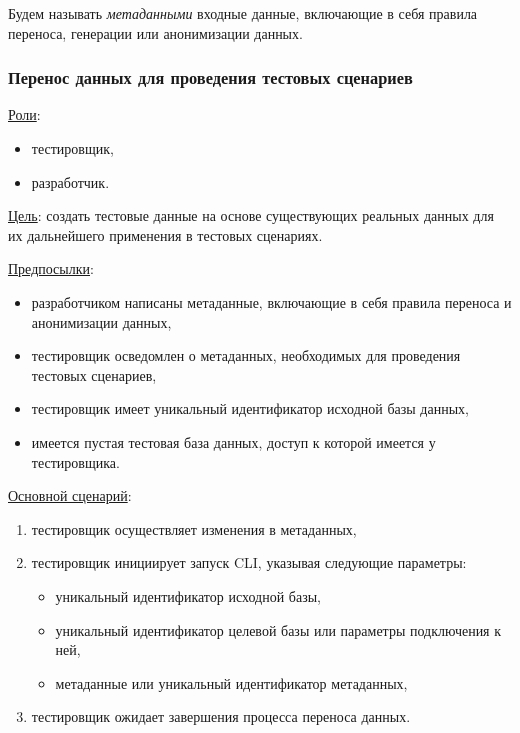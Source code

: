 Будем называть \textit{метаданными} входные данные, включающие в себя правила переноса, генерации или анонимизации данных.

\subsubsection{Перенос данных для проведения тестовых сценариев}

\underline{Роли}:

\begin{itemize}
    \item тестировщик,
    \item разработчик.
\end{itemize}

\underline{Цель}: создать тестовые данные на основе существующих реальных данных для их дальнейшего применения в тестовых сценариях.

\underline{Предпосылки}:

\begin{itemize}
    \item разработчиком написаны метаданные, включающие в себя правила переноса и анонимизации данных,
    \item тестировщик осведомлен о метаданных, необходимых для проведения тестовых сценариев,
    \item тестировщик имеет уникальный идентификатор исходной базы данных,
    \item имеется пустая тестовая база данных, доступ к которой имеется у тестировщика.
\end{itemize}

\underline{Основной сценарий}:

\begin{enumerate}
    \item тестировщик осуществляет изменения в метаданных,
    \item тестировщик инициирует запуск CLI, указывая следующие параметры:
    \begin{itemize}
        \item уникальный идентификатор исходной базы,
        \item уникальный идентификатор целевой базы или параметры подключения к ней,
        \item метаданные или уникальный идентификатор метаданных,
    \end{itemize}
    \item тестировщик ожидает завершения процесса переноса данных.
\end{enumerate}

